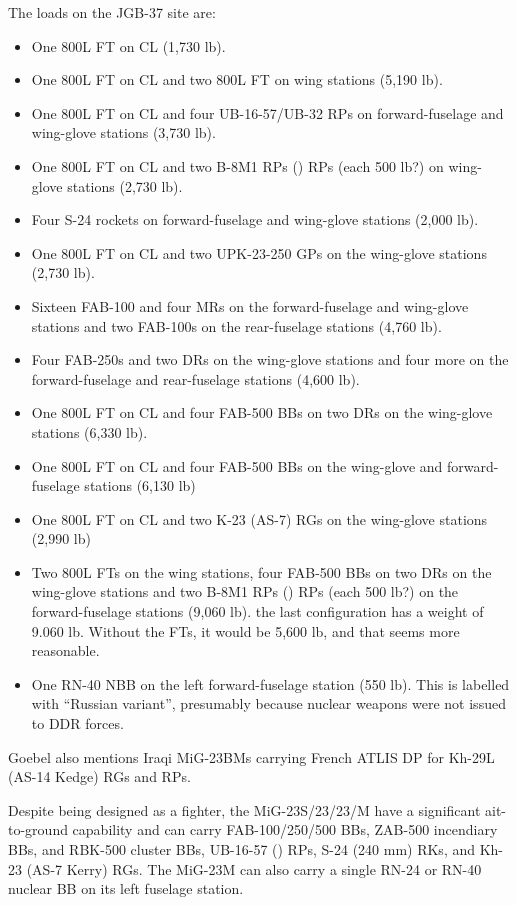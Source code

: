 {    The loads on the JGB-37 site are:
    \begin{itemize}
        \item One 800L FT on CL (1,730 lb).
        \item One 800L FT on CL and two 800L FT on wing stations (5,190 lb).
        \item One 800L FT on CL and four UB-16-57/UB-32 RPs on forward-fuselage and wing-glove stations (3,730 lb).
        \item One 800L FT on CL and two B-8M1 RPs () RPs (each 500 lb?) on wing-glove stations (2,730 lb).
        \item Four S-24 rockets on forward-fuselage and wing-glove stations (2,000 lb).
        \item One 800L FT on CL and two UPK-23-250 GPs on the wing-glove stations (2,730 lb).
        \item Sixteen FAB-100 and four MRs on the forward-fuselage and wing-glove stations and two FAB-100s on the rear-fuselage stations (4,760 lb).
        \item Four FAB-250s and two DRs on the wing-glove stations and four more on the forward-fuselage and rear-fuselage stations (4,600 lb).
        \item One 800L FT on CL and four FAB-500 BBs on two DRs on the wing-glove stations (6,330 lb).
        \item One 800L FT on CL and four FAB-500 BBs on the wing-glove and forward-fuselage stations (6,130 lb)
        \item One 800L FT on CL and two K-23 (AS-7) RGs on the wing-glove stations (2,990 lb)
        \item Two 800L FTs on the wing stations, four FAB-500 BBs on two DRs on the wing-glove stations and two B-8M1 RPs () RPs (each 500 lb?) on the forward-fuselage stations (9,060 lb). the last configuration has a weight of 9.060 lb. Without the FTs, it would be 5,600 lb, and that seems more reasonable.
        \item One RN-40 NBB on the left forward-fuselage station (550 lb). This is labelled with “Russian variant”, presumably because nuclear weapons were not issued to DDR forces.
    \end{itemize}
Goebel also mentions Iraqi MiG-23BMs carrying French ATLIS DP for Kh-29L (AS-14 Kedge) RGs and  RPs.}
Despite being designed as a fighter, the MiG-23S/23/23/M have a significant ait-to-ground capability and can carry FAB-100/250/500 BBs, ZAB-500 incendiary BBs, and RBK-500 cluster BBs, UB-16-57 () RPs, S-24 (240 mm) RKs, and Kh-23 (AS-7 Kerry) RGs.
The MiG-23M can also carry a single RN-24 or RN-40 nuclear BB on its left fuselage station.

